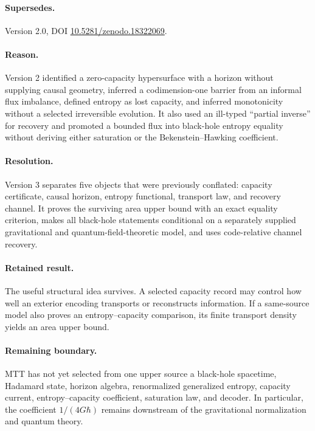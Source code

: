 \documentclass[11pt,a4paper]{article}
\numberwithin{equation}{section}
\theoremstyle{definition}
\theoremstyle{remark}
\begin{document}
\paragraph{Supersedes.}
Version 2.0, DOI
\href{https://doi.org/10.5281/zenodo.18322069}
{10.5281/zenodo.18322069}.

\paragraph{Reason.}
Version 2 identified a zero-capacity hypersurface with a horizon without
supplying causal geometry, inferred a codimension-one barrier from an
informal flux imbalance, defined entropy as lost capacity, and inferred
monotonicity without a selected irreversible evolution.  It also used an
ill-typed ``partial inverse'' for recovery and promoted a bounded flux into
black-hole entropy equality without deriving either saturation or the
Bekenstein--Hawking coefficient.

\paragraph{Resolution.}
Version 3 separates five objects that were previously conflated:
capacity certificate, causal horizon, entropy functional, transport law,
and recovery channel.  It proves the surviving area upper bound with an
exact equality criterion, makes all black-hole statements conditional on
a separately supplied gravitational and quantum-field-theoretic model,
and uses code-relative channel recovery.

\paragraph{Retained result.}
The useful structural idea survives.  A selected capacity record may
control how well an exterior encoding transports or reconstructs
information.  If a same-source model also proves an entropy--capacity
comparison, its finite transport density yields an area upper bound.

\paragraph{Remaining boundary.}
MTT has not yet selected from one upper source a black-hole spacetime,
Hadamard state, horizon algebra, renormalized generalized entropy,
capacity current, entropy--capacity coefficient, saturation law, and
decoder.  In particular, the coefficient \(1/(4G\hbar)\) remains
downstream of the gravitational normalization and quantum theory.
\end{document}
